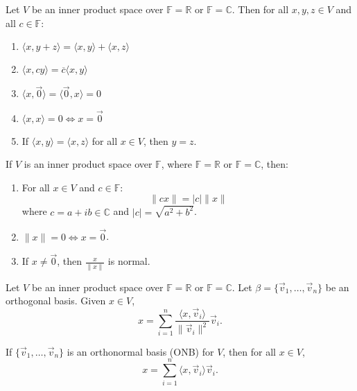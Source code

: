 \documentclass{article}
\newcommand{\R}{\mathbb{R}}
\newcommand{\C}{\mathbb{C}}
\newcommand{\F}{\mathbb{F}}
\begin{document}
\begin{theorem}[IP Properties]
    Let \( V \) be an inner product space over \( \F = \R \) or \( \F = \C \). Then for all \( x, y, z \in V \) and all \( c \in \F \):
    \begin{enumerate}[label=(\alph*)]
        \item \(\langle x, y + z \rangle = \langle x, y \rangle + \langle x, z \rangle\)
        \item \(\langle x, cy \rangle = \overline{c} \langle x, y \rangle\)
        \item \(\langle x, \vec{0} \rangle = \langle \vec{0}, x \rangle = 0\)
        \item \(\langle x, x \rangle = 0 \iff x = \vec{0}\)
        \item If \(\langle x, y \rangle = \langle x, z \rangle\) for all \( x \in V \), then \( y = z \).
    \end{enumerate}
\end{theorem}


\begin{theorem}
    If \( V \) is an inner product space over \( \F \), where \( \F = \R \) or \( \F = \C \), then:
    \begin{enumerate}[label=(\alph*)]
        \item For all \( x \in V \) and \( c \in \F \):
        \[
        \| cx \| = |c| \| x \|
        \]
        where \( c = a + ib \in \C \) and \(|c| = \sqrt{a^2 + b^2} \).

        \item \(\| x \| = 0 \iff x = \vec{0}\).

        \item If \( x \neq \vec{0} \), then \(\frac{x}{\| x \|}\) is normal.
    \end{enumerate}
\end{theorem}



\begin{theorem}
    Let \( V \) be an inner product space over \( \F = \R \) or \( \F = \C \). Let \(\beta = \{ \vec{v}_1, \ldots, \vec{v}_n \} \) be an orthogonal basis. Given \( x \in V \),
    \[
    x = \sum_{i=1}^{n} \frac{\langle x, \vec{v}_i \rangle}{\|\vec{v}_i\|^2} \vec{v}_i.
    \]
\end{theorem}

\begin{corollary}
    If \(\{ \vec{v}_1, \ldots, \vec{v}_n \}\) is an orthonormal basis (ONB) for \( V \), then for all \( x \in V \),
    \[
    x = \sum_{i=1}^{n} \langle x, \vec{v}_i \rangle \vec{v}_i.
    \]
\end{corollary}
\end{document}
